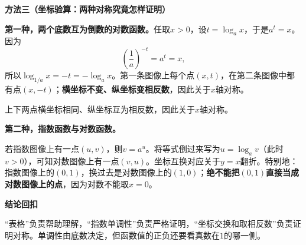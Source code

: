 \clearpage
\begin{proofbox}
\textbf{\textcolor{CProof}{方法三（坐标验算：两种对称究竟怎样证明）}}



\textbf{第一种，两个底数互为倒数的对数函数。}任取$x>0$，设$t=\log_a x$，于是$a^t=x$。因为
\[
 \left(\frac1a\right)^{-t}=a^t=x,
\]
所以$\log_{1/a}x=-t=-\log_a x$。第一条图像上每个点$(x,t)$，在第二条图像中都有点$(x,-t)$；\textbf{横坐标不变、纵坐标变相反数}，因此关于$x$轴对称。

\begin{center}
\par\small 上下两点横坐标相同、纵坐标互为相反数，因此关于$x$轴对称。
\end{center}


\end{proofbox}
\clearpage
\begin{proofbox}
\textbf{第二种，指数函数与对数函数。}

若指数图像上有一点$(u,v)$，则$v=a^u$。将等式倒过来写为$u=\log_a v$（此时$v>0$），可知对数图像上有一点$(v,u)$。坐标互换对应关于$y=x$翻折。特别地：指数图像上的$(0,1)$，换过去是对数图像上的$(1,0)$；\textbf{绝不能把$(0,1)$直接当成对数图像上的点}，因为对数不能取$x=0$。

\medskip
\textbf{\textcolor{CProof}{结论回扣}}

	“表格”负责帮助理解，“指数单调性”负责严格证明，“坐标交换和取相反数”负责证明对称。单调性由底数决定，但函数值的正负还要看真数在$1$的哪一侧。

\end{proofbox}
